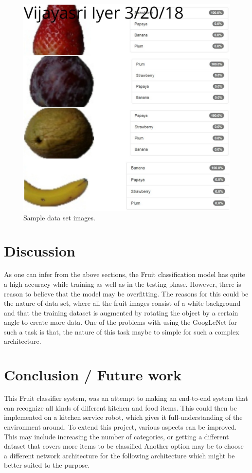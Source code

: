 \documentclass[10pt,journal,compsoc]{IEEEtran}
\begin{document}
\begin{figure}[tbhp]
      \centering
      \includegraphics[width=\linewidth]{ownres.jpg}
      \caption{Sample data set images.}
      \label{fig:robot1}
\end{figure}

\section{Discussion}
As one can infer from the above sections, the Fruit classification model has quite a high accuracy while training as well as in the testing phase. However, there is reason to believe that the model may be overfitting. The reasons for this could be the nature of data set, where all the fruit images consist of a white background and that the training dataset is augmented by rotating the object by a certain angle to create more data. One of the problems with using the GoogLeNet for such a task is that, the nature of this task maybe to simple for such a complex architecture. 

\section{Conclusion / Future work}
This Fruit classifier system, was an attempt to making an end-to-end system that can recognize all kinds of different kitchen and food items. This could then be implemented on a kitchen service robot, which gives it full-understanding of the environment around. To extend this project, various aspects can be improved. This may include increasing the number of categories, or getting a different dataset that covers more items to be classified Another option may be to choose a different network architecture for the following architecture which might be better suited to the purpose. 




\end{document}

